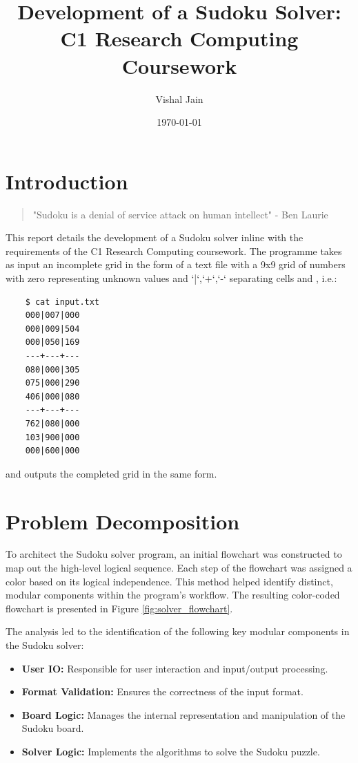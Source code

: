 \documentclass[11pt]{article}
\title{Development of a Sudoku Solver: C1 Research Computing Coursework}
\author{Vishal Jain}
\date{\today}
\begin{document}
\maketitle

\tableofcontents

\newpage

\section{Introduction}

\begin{quote}
    "Sudoku is a denial of service attack on human
  intellect" - Ben Laurie
\end{quote}

This report details the development of a Sudoku solver inline with the requirements of the C1 Research Computing coursework. The programme takes as input an incomplete grid in the form of a text file with a 9x9 grid of numbers with zero representing unknown values and `|`,`+`,`-` separating cells and , i.e.:


\begin{verbatim}
    $ cat input.txt
    000|007|000
    000|009|504
    000|050|169
    ---+---+---
    080|000|305
    075|000|290
    406|000|080
    ---+---+---
    762|080|000
    103|900|000
    000|600|000
    \end{verbatim}

and outputs the completed grid in the same form.


\section{Problem Decomposition}
To architect the Sudoku solver program, an initial flowchart was constructed to map out the high-level logical sequence. Each step of the flowchart was assigned a color based on its logical independence. This method helped identify distinct, modular components within the program's workflow. The resulting color-coded flowchart is presented in Figure \ref{fig:solver_flowchart}.


The analysis led to the identification of the following key modular components in the Sudoku solver:

\begin{itemize}
\item \textbf{User IO:} Responsible for user interaction and input/output processing.
\item \textbf{Format Validation:} Ensures the correctness of the input format.
\item \textbf{Board Logic:} Manages the internal representation and manipulation of the Sudoku board.
\item \textbf{Solver Logic:} Implements the algorithms to solve the Sudoku puzzle.
\end{itemize}
\end{document}
